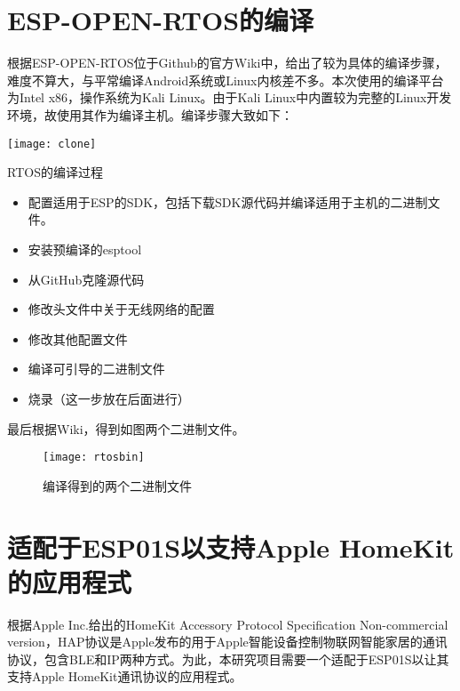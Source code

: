 \section{ESP-OPEN-RTOS的编译}

\setlength\parindent{2em} 根据ESP-OPEN-RTOS位于Github的官方Wiki中，给出了较为具体的编译步骤，难度不算大，与平常编译Android系统或Linux内核差不多。本次使用的编译平台为Intel x86，操作系统为Kali Linux。由于Kali Linux中内置较为完整的Linux开发环境，故使用其作为编译主机。编译步骤大致如下：

\begin{marginfigure}[0cm]
	\texttt{[image: clone]}
	\caption[clone]{RTOS的编译过程}
\end{marginfigure}


\begin{itemize}
	\item 配置适用于ESP的SDK，包括下载SDK源代码并编译适用于主机的二进制文件。
	\item 安装预编译的esptool
	\item 从GitHub克隆源代码
	\item 修改头文件中关于无线网络的配置
	\item 修改其他配置文件
	\item 编译可引导的二进制文件
	\item 烧录（这一步放在后面进行）
\end{itemize}

最后根据Wiki，得到如图两个二进制文件。

\begin{figure*}[h!]
	\texttt{[image: rtosbin]}
	\caption[rtosbin]{编译得到的两个二进制文件}
\end{figure*}

\section{适配于ESP01S以支持Apple HomeKit的应用程式}

\setlength\parindent{2em} 根据Apple Inc.给出的HomeKit Accessory Protocol Specification Non-commercial version，HAP协议是Apple发布的用于Apple智能设备控制物联网智能家居的通讯协议，包含BLE和IP两种方式。为此，本研究项目需要一个适配于ESP01S以让其支持Apple HomeKit通讯协议的应用程式。

